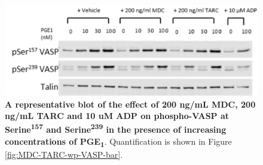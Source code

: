 \documentclass[11pt,twoside]{bristolthesis}
\begin{document}
\begin{figure}

{\centering \includegraphics[width=0.55\linewidth]{figure/Chemokines/MDC_TARC_VASP_blot} 

}

\caption[A representative blot of the effect of MDC, TARC and ADP on PGE\textsubscript{1} stimulated phospho-VASP.]{\textbf{A representative blot of the effect of 200 ng/mL MDC, 200 ng/mL TARC and 10 uM ADP on phospho-VASP at Serine\textsuperscript{157} and Serine\textsuperscript{239} in the presence of increasing concentrations of PGE\textsubscript{1}}. Quantification is shown in Figure \ref{fig:MDC-TARC-wp-VASP-bar}.}\label{fig:MDC-TARC-wp-WB-VASP}
\end{figure}
\end{document}
